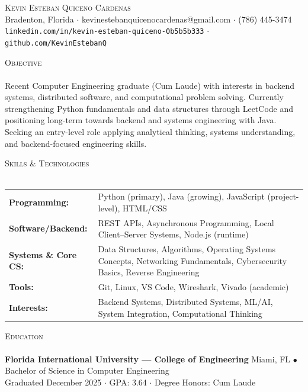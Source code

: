 \documentclass[a4paper]{article}
\newcommand{\lineunder}{
    \vspace*{-8pt}\\
    \hspace*{-18pt}\hrulefill\\
}
\newcommand{\header}[1]{
    {\hspace*{-18pt}\vspace*{6pt} \textsc{#1}}
    \vspace*{-6pt}\lineunder
}
\newcommand{\school}[4]{
    \textbf{#1} #2 $\bullet$ #3\\
    #4\\
}
\begin{document}
\small
\vspace*{-40pt}

\begin{center}
    {\Huge \scshape Kevin Esteban Quiceno Cardenas}\\
    Bradenton, Florida $\cdot$ kevinestebanquicenocardenas@gmail.com $\cdot$ (786) 445-3474\\
    \texttt{linkedin.com/in/kevin-esteban-quiceno-0b5b5b333} $\cdot$
    \texttt{github.com/KevinEstebanQ}
\end{center}

\header{Objective}
Recent Computer Engineering graduate (Cum Laude) with interests in backend systems, distributed software, and computational problem solving. Currently strengthening Python fundamentals and data structures through LeetCode and positioning long-term towards backend and systems engineering with Java. Seeking an entry-level role applying analytical thinking, systems understanding, and backend-focused engineering skills.

\header{Skills \& Technologies}

\begin{tabular}{@{}p{3.2cm}p{12cm}@{}}
\textbf{Programming:} &
Python (primary), Java (growing), JavaScript (project-level), HTML/CSS \\[1pt]

\textbf{Software/Backend:} &
REST APIs, Asynchronous Programming, Local Client--Server Systems, Node.js (runtime) \\[1pt]

\textbf{Systems \& Core CS:} &
Data Structures, Algorithms, Operating Systems Concepts, Networking Fundamentals, Cybersecurity Basics, Reverse Engineering \\[1pt]

\textbf{Tools:} &
Git, Linux, VS Code, Wireshark, Vivado (academic) \\[1pt]

\textbf{Interests:} &
Backend Systems, Distributed Systems, ML/AI, System Integration, Computational Thinking \\
\end{tabular}

\header{Education}

\school
{Florida International University --- College of Engineering}
{Miami, FL}
{Bachelor of Science in Computer Engineering}
{Graduated December 2025 $\cdot$ GPA: 3.64 $\cdot$ Degree Honors: Cum Laude}
\end{document}
